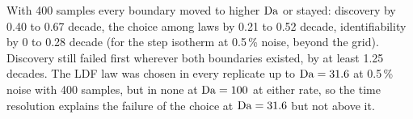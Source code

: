 \noindent With 400 samples every boundary moved to higher $\mathrm{Da}$ or stayed: discovery by 0.40 to
0.67 decade, the choice among laws by 0.21 to 0.52 decade, identifiability by 0 to 0.28 decade
(for the step isotherm at 0.5\,\% noise, beyond the grid). Discovery still failed first wherever
both boundaries existed, by at least 1.25 decades. The LDF law was chosen in every replicate up to
$\mathrm{Da} = 31.6$ at 0.5\,\% noise with 400 samples, but in none at $\mathrm{Da} = 100$ at either rate, so
the time resolution explains the failure of the choice at $\mathrm{Da} = 31.6$ but not above it.

